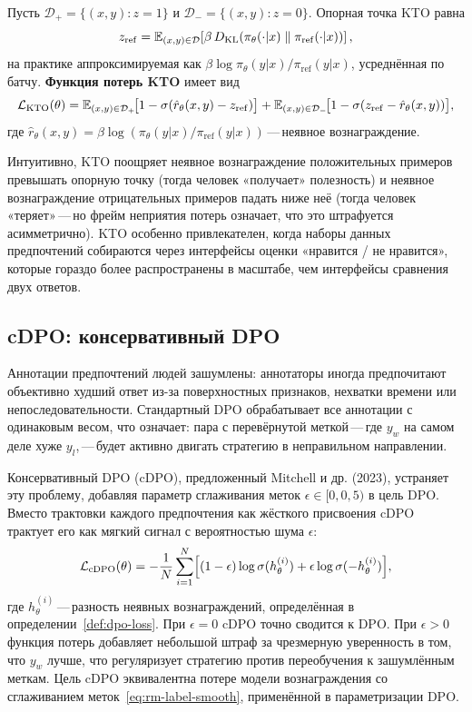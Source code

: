 \begin{definition}
\label{def:kto-loss}
Пусть $\mathcal{D}_+ = \{(x, y) : z=1\}$ и $\mathcal{D}_- = \{(x, y) : z=0\}$. Опорная точка KTO равна
\[
z_\mathrm{ref} = \operatorname{\mathbb{E}}_{(x,y) \in \mathcal{D}} \!\left[\beta\,D_{\mathrm{KL}}\!\left(\pi_\theta(\cdot|x)\;\|\;\pi_\mathrm{ref}(\cdot|x)\right)\right],
\]
на практике аппроксимируемая как $\beta \log\pi_\theta(y|x)/\pi_\mathrm{ref}(y|x)$, усреднённая по батчу. \textbf{Функция потерь KTO} имеет вид
\begin{equation}
\label{eq:kto-loss}
\mathcal{L}_\mathrm{KTO}(\theta)
= \operatorname{\mathbb{E}}_{(x,y)\in\mathcal{D}_+}\!\bigl[1 - \sigma(\hat{r}_\theta(x,y) - z_\mathrm{ref})\bigr]
+ \operatorname{\mathbb{E}}_{(x,y)\in\mathcal{D}_-}\!\bigl[1 - \sigma(z_\mathrm{ref} - \hat{r}_\theta(x,y))\bigr],
\end{equation}
где $\hat{r}_\theta(x,y) = \beta\log(\pi_\theta(y|x)/\pi_\mathrm{ref}(y|x))$\,---\,неявное вознаграждение.
\end{definition}

Интуитивно, KTO поощряет неявное вознаграждение положительных примеров превышать опорную точку (тогда человек «получает» полезность) и неявное вознаграждение отрицательных примеров падать ниже неё (тогда человек «теряет»\,---\,но фрейм неприятия потерь означает, что это штрафуется асимметрично). KTO особенно привлекателен, когда наборы данных предпочтений собираются через интерфейсы оценки «нравится / не нравится», которые гораздо более распространены в масштабе, чем интерфейсы сравнения двух ответов.

\subsection{cDPO: консервативный DPO}

Аннотации предпочтений людей зашумлены: аннотаторы иногда предпочитают объективно худший ответ из-за поверхностных признаков, нехватки времени или непоследовательности. Стандартный DPO обрабатывает все аннотации с одинаковым весом, что означает: пара с перевёрнутой меткой\,---\,где $y_w$ на самом деле хуже $y_l$,\,---\,будет активно двигать стратегию в неправильном направлении.

Консервативный DPO (cDPO), предложенный Mitchell и др. (2023), устраняет эту проблему, добавляя параметр сглаживания меток $\epsilon \in [0, 0{,}5)$ в цель DPO. Вместо трактовки каждого предпочтения как жёсткого присвоения cDPO трактует его как мягкий сигнал с вероятностью шума $\epsilon$:
\begin{equation}
\label{eq:cdpo-loss}
\mathcal{L}_\mathrm{cDPO}(\theta)
= -\frac{1}{N}\sum_{i=1}^{N}
\Bigl[
(1 - \epsilon)\log\sigma(h^{(i)}_\theta)
+ \epsilon\log\sigma(-h^{(i)}_\theta)
\Bigr],
\end{equation}
где $h^{(i)}_\theta$\,---\,разность неявных вознаграждений, определённая в определении~\ref{def:dpo-loss}. При $\epsilon = 0$ cDPO точно сводится к DPO. При $\epsilon > 0$ функция потерь добавляет небольшой штраф за чрезмерную уверенность в том, что $y_w$ лучше, что регуляризует стратегию против переобучения к зашумлённым меткам. Цель cDPO эквивалентна потере модели вознаграждения со сглаживанием меток~\eqref{eq:rm-label-smooth}, применённой в параметризации DPO.

